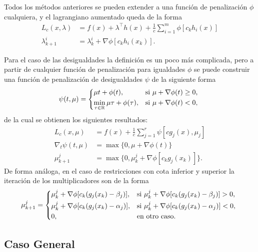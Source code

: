 Todos los métodos anteriores se pueden extender a una función de penalización \(\phi\) cualquiera, y el lagrangiano aumentado queda de la forma
\begin{align*}
	L_{c}(x, \lambda)	&= f(x) + \lambda^{\top} h(x) + \frac{1}{c} \sum_{i=1}^{m} \phi[c_k h_i(x)] \\
	\lambda_{k+1}^{i}	&= \lambda_{k}^{i} + \nabla \phi [c_{k} h_{i}(x_{k})].
\end{align*}

Para el caso de las desigualdades la definición es un poco más complicada, pero a partir de cualquier función de penalización para igualdades \(\phi\) se puede construir una función de penalización de desigualdades \(\psi\) de la siguiente forma
\begin{equation*}
	\psi (t, \mu) = \begin{dcases*}
		\mu t + \phi(t),								& si \(\mu + \nabla \phi (t) \geq 0\), \\
		\min_{\tau \in \reals} \mu \tau + \phi (\tau),	& si \(\mu + \nabla \phi (t) < 0\),
	\end{dcases*}
\end{equation*}
de la cual se obtienen los siguientes resultados:
\begin{align*}
	L_{c}(x, \mu)			&= f(x) + \frac{1}{c} \sum_{j=1}^{r} \psi [c g_{j}(x), \mu_{j}] \\
	\nabla_{t} \psi(t, \mu)	&= \max \{0, \mu + \nabla \phi(t)\} \\
	\mu_{k+1}^{j}			&= \max \{0, \mu_{k}^{j} + \nabla \phi[c_{k} g_{j}(x_{k})]\}.
\end{align*}
De forma análoga, en el caso de restricciones con cota inferior y superior la iteración de los multiplicadores son de la forma
\begin{equation*}
	\mu_{k+1}^{j} = \begin{dcases*}
		\mu_{k}^{j} + \nabla \phi[c_{k} (g_{j}(x_{k}) - \beta_{j})],	& si \(\mu_{k}^{j} + \nabla \phi [c_{k} (g_{j}(x_{k}) - \beta_{j})] > 0\), \\
		\mu_{k}^{j} + \nabla \phi[c_{k} (g_{j}(x_{k}) - \alpha_{j})],	& si \(\mu_{k}^{j} + \nabla \phi [c_{k} (g_{j}(x_{k}) - \alpha_{j})] < 0\), \\
		0,																& en otro caso.
	\end{dcases*}
\end{equation*}

\subsection{Caso General}


